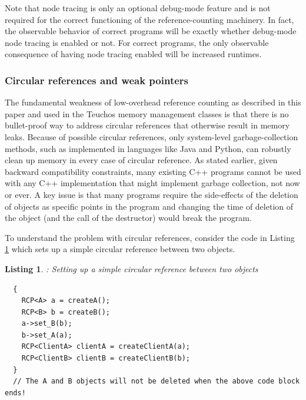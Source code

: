 \documentclass[pdf,ps2pdf,11pt]{SANDreport}
\newtheorem{listing}{Listing}
\begin{document}
Note that node tracing is only an optional debug-mode feature and is
not required for the correct functioning of the reference-counting
machinery.  In fact, the observable behavior of correct programs will
be exactly whether debug-mode node tracing is enabled or not.  For
correct programs, the only observable consequence of having node
tracing enabled will be increased runtimes.


%
{}\subsubsection{Circular references and weak pointers}
\label{sec:circular-references-weak-pointers}
%

The fundamental weakness of low-overhead reference counting as
described in this paper and used in the Teuchos memory management
classes is that there is no bullet-proof way to address circular
references that otherwise result in memory leaks.  Because of possible
circular references, only system-level garbage-collection methods,
such as implemented in languages like Java and Python, can robustly
clean up memory in every case of circular reference.  As stated
earlier, given backward compatibility constraints, many existing C++
programs cannot be used with any C++ implementation that might
implement garbage collection, not now or ever.  A key issue is that
many programs require the side-effects of the deletion of objects as
specific points in the program and changing the time of deletion of
the object (and the call of the destructor) would break the program.

To understand the problem with circular references, consider the code
in Listing {}\ref{listing:CircularRCP_A_B} which sets up a simple
circular reference between two objects.


\begin{listing}: Setting up a simple circular reference between two objects \\
\label{listing:CircularRCP_A_B}
{\small\begin{verbatim}
  {
    RCP<A> a = createA();
    RCP<B> b = createB();
    a->set_B(b);
    b->set_A(a);
    RCP<ClientA> clientA = createClientA(a);
    RCP<ClientB> clientB = createClientB(b);
  }
  // The A and B objects will not be deleted when the above code block ends!
\end{verbatim}}
\end{listing}
\end{document}
